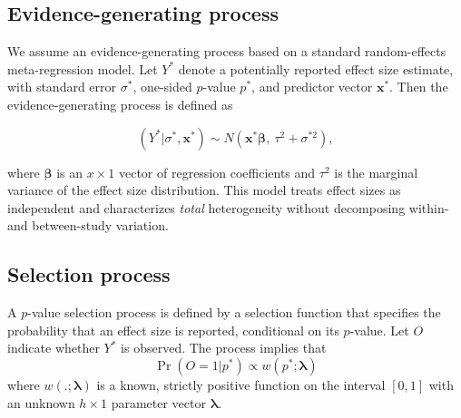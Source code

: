 \documentclass[
  american,
  man, donotrepeattitle,floatsintext]{apa7}
\begin{document}
\subsection{Evidence-generating process}\label{evidence-generating-process}

We assume an evidence-generating process based on a standard random-effects meta-regression model. Let \(Y^*\) denote a potentially reported effect size estimate, with standard error \(\sigma^*\), one-sided \(p\)-value \(p^*\), and predictor vector \(\mathbf{x}^*\). Then the evidence-generating process is defined as

\begin{equation}
\label{eq:meta-mean-regression}
\left(Y^* | \sigma^*, \mathbf{x}^*\right) \sim N\left(\mathbf{x}^* \boldsymbol\beta, \ \tau^2 + \sigma^{*2}\right),
\end{equation}

where \(\boldsymbol\beta\) is an \(x \times 1\) vector of regression coefficients and \(\tau^2\) is the marginal variance of the effect size distribution. This model treats effect sizes as independent and characterizes \emph{total} heterogeneity without decomposing within- and between-study variation.

\subsection{Selection process}\label{selection-process}

A \(p\)-value selection process is defined by a selection function that specifies the probability that an effect size is reported, conditional on its \(p\)-value. Let \(O\) indicate whether \(Y^*\) is observed. The process implies that
\begin{equation}
\label{eq:selection-process}
\Pr\left(O = 1 | p^* \right) \propto w\left(p^*; \boldsymbol\lambda \right)
\end{equation}
where \(w\left(.; \boldsymbol\lambda\right)\) is a known, strictly positive function on the interval \([0, 1]\) with an unknown \(h \times 1\) parameter vector \(\boldsymbol\lambda\).
\end{document}
